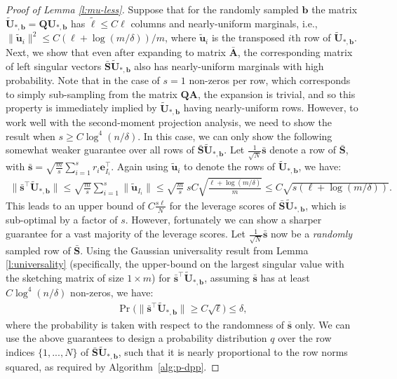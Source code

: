 \documentclass[11pt]{article}
\let\origtop\top
\renewcommand\top{{\scriptscriptstyle{\origtop}}}
\def\e{{\mathbf e}}
\def\u{{\mathbf u}}
\def\ss{{\mathbf s}}
\def\b{{\mathbf b}}
\def\A{{\mathbf A}}
\def\Q{{\mathbf Q}}
\def\S{{\mathbf S}}
\def\U{{\mathbf U}}
\begin{document}
\begin{proof}[Proof of Lemma \ref{l:mu-less}]
  Suppose that for the randomly sampled $\b$ the matrix $\tilde\U_{*,\b}=\Q\U_{*,\b}$ has $\tilde \ell\leq C\ell$ columns and nearly-uniform marginals, i.e., $\|\tilde\u_i\|^2 \leq C(\ell+\log(m/\delta))/m$, where $\tilde\u_i$ is the transposed $i$th row of $\tilde\U_{*,\b}$. 
  Next, we show that even after expanding to matrix $\bar\A$, the corresponding matrix of left singular vectors $\bar\S\tilde\U_{*,\b}$ also has nearly-uniform marginals with high probability. Note that in the case of $s=1$ non-zeros per row, which corresponds to simply sub-sampling from the matrix $\Q\A$, the expansion is trivial, and so this property is immediately implied by $\tilde\U_{*,\b}$ having nearly-uniform rows. However, to work well with the second-moment projection analysis, we need to show the result when $s \geq C\log^4(n/\delta)$. In this case, we can only show the following somewhat weaker guarantee over all rows of $\bar\S\tilde\U_{*,\b}$. Let $\frac1{\sqrt N}\bar\ss$ denote a row of $\bar\S$, with $\bar\ss =\sqrt{\frac m{s}}\sum_{i=1}^sr_{i}\e_{I_i}^\top$. Again using $\tilde\u_i$ to denote the rows of $\tilde\U_{*,\b}$, we have:
  \begin{align*}
  \|\bar\ss^\top\tilde\U_{*,\b}\| \leq
  \sqrt{\frac{m}{s}}\sum_{i=1}^s\|\tilde\u_{I_i}\| \leq
  \sqrt{\frac{m}{s}}\  sC\sqrt{\frac{\ell+\log(m/\delta)}{m}}\leq C\sqrt{s(\ell+\log(m/\delta))}.
\end{align*}
This leads to an upper bound of $C\frac{s\ell}{N}$ 
for the leverage scores of $\bar\S\tilde\U_{*,\b}$, which is sub-optimal by a factor of $s$. However, fortunately we can show a sharper guarantee for a vast majority of the leverage scores. Let $\frac1{\sqrt N}\bar\ss$ now be a \emph{randomly} sampled row of $\bar\S$. Using the Gaussian universality result from Lemma \ref{l:universality} (specifically, the upper-bound on the largest singular value with the sketching matrix of size $1 \times m$)
for $\bar\ss^\top\tilde\U_{*,\b}$, assuming
$\bar\ss$ has at least $C\log^4(n/\delta)$ 
 non-zeros, we have:
\begin{align}
  \Pr\big(\|\bar\ss^\top\tilde\U_{*,\b}\|\geq C\sqrt \ell\big) \leq \delta,\label{eq:prsbar} 
\end{align}
where the probability is taken with respect to the randomness of $\bar\ss$ only. We can use the above guarantees to design a probability distribution $q$ over the row indices $\{1,...,N\}$ of $\bar\S\tilde\U_{*,\b}$, such that it is nearly proportional to the row norms squared, as required by Algorithm~\ref{alg:p-dpp}.


\end{proof}
\end{document}

